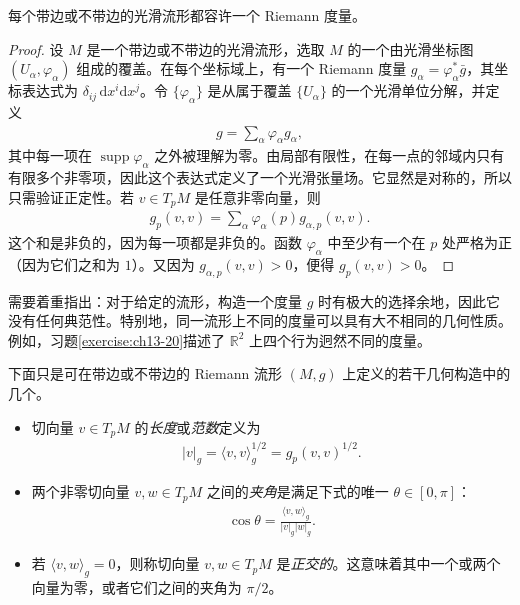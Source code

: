 \documentclass[../../main.tex]{subfiles}
\begin{document}
\begin{proposition}\label{proposition:ch13-existence}
每个带边或不带边的光滑流形都容许一个 Riemann 度量。
\end{proposition}

\begin{proof}
设 $M$ 是一个带边或不带边的光滑流形，选取 $M$ 的一个由光滑坐标图 $(U_\alpha,\varphi_\alpha)$ 组成的覆盖。在每个坐标域上，有一个 Riemann 度量 $g_\alpha=\varphi_\alpha^*\bar g$，其坐标表达式为 $\delta_{ij}\,\mathrm{d}x^i\mathrm{d}x^j$。令 $\{\varphi_\alpha\}$ 是从属于覆盖 $\{U_\alpha\}$ 的一个光滑单位分解，并定义
\begin{align*}
g=\sum_\alpha \varphi_\alpha g_\alpha,
\end{align*}
其中每一项在 $\operatorname{supp}\varphi_\alpha$ 之外被理解为零。由局部有限性，在每一点的邻域内只有有限多个非零项，因此这个表达式定义了一个光滑张量场。它显然是对称的，所以只需验证正定性。若 $v\in T_pM$ 是任意非零向量，则
\begin{align*}
g_p(v,v)=\sum_\alpha \varphi_\alpha(p)g_{\alpha,p}(v,v).
\end{align*}
这个和是非负的，因为每一项都是非负的。函数 $\varphi_\alpha$ 中至少有一个在 $p$ 处严格为正（因为它们之和为 $1$）。又因为 $g_{\alpha,p}(v,v)>0$，便得 $g_p(v,v)>0$。
\end{proof}

需要着重指出：对于给定的流形，构造一个度量 $g$ 时有极大的选择余地，因此它没有任何典范性。特别地，同一流形上不同的度量可以具有大不相同的几何性质。例如，习题\ref{exercise:ch13-20}描述了 $\mathbb{R}^2$ 上四个行为迥然不同的度量。

下面只是可在带边或不带边的 Riemann 流形 $(M,g)$ 上定义的若干几何构造中的几个。

\begin{itemize}
\item 切向量 $v\in T_pM$ 的\emph{长度}或\emph{范数}定义为
\begin{align*}
|v|_g=\langle v,v\rangle_g^{1/2}=g_p(v,v)^{1/2}.
\end{align*}
\item 两个非零切向量 $v,w\in T_pM$ 之间的\emph{夹角}是满足下式的唯一 $\theta\in[0,\pi]$：
\begin{align*}
\cos\theta=\frac{\langle v,w\rangle_g}{|v|_g|w|_g}.
\end{align*}
\item 若 $\langle v,w\rangle_g=0$，则称切向量 $v,w\in T_pM$ 是\emph{正交的}。这意味着其中一个或两个向量为零，或者它们之间的夹角为 $\pi/2$。
\end{itemize}
\end{document}
